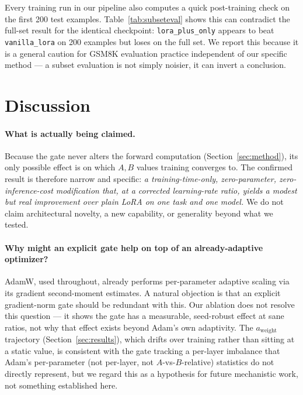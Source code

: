 \documentclass[11pt]{article}
\begin{document}
Every training run in our pipeline also computes a quick post-training
check on the first 200 test examples. Table~\ref{tab:subseteval} shows
this can contradict the full-set result for the identical checkpoint:
\texttt{lora\_plus\_only} appears to beat \texttt{vanilla\_lora} on 200
examples but loses on the full set. We report this because it is a
general caution for GSM8K evaluation practice independent of our specific
method — a subset evaluation is not simply noisier, it can invert a
conclusion.

\section{Discussion}
\label{sec:discussion}

\paragraph{What is actually being claimed.} Because the gate never alters
the forward computation (Section~\ref{sec:method}), its only possible
effect is on which $A,B$ values training converges to. The confirmed
result is therefore narrow and specific: \emph{a training-time-only,
zero-parameter, zero-inference-cost modification that, at a corrected
learning-rate ratio, yields a modest but real improvement over plain LoRA
on one task and one model.} We do not claim architectural novelty, a new
capability, or generality beyond what we tested.

\paragraph{Why might an explicit gate help on top of an already-adaptive
optimizer?} AdamW, used throughout, already performs per-parameter
adaptive scaling via its gradient second-moment estimates. A natural
objection is that an explicit gradient-norm gate should be redundant with
this. Our ablation does not resolve this question — it shows the gate has
a measurable, seed-robust effect at sane ratios, not why that effect
exists beyond Adam's own adaptivity. The $a_{\text{weight}}$ trajectory
(Section~\ref{sec:results}), which drifts over training rather than
sitting at a static value, is consistent with the gate tracking a
per-layer imbalance that Adam's per-parameter (not per-layer, not
$A$-vs-$B$-relative) statistics do not directly represent, but we regard
this as a hypothesis for future
mechanistic work, not something established here.
\end{document}
